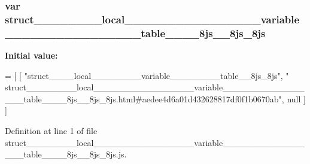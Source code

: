 \subsubsection[{struct\+\_\+\+\_\+\+\_\+\+\_\+\+\_\+\+\_\+\+\_\+\+\_\+local\+\_\+\+\_\+\+\_\+\+\_\+\+\_\+\+\_\+\+\_\+\+\_\+\+\_\+\+\_\+\+\_\+\+\_\+\+\_\+\+\_\+\+\_\+\+\_\+variable\+\_\+\+\_\+\+\_\+\+\_\+\+\_\+\+\_\+\+\_\+\+\_\+\+\_\+\+\_\+\+\_\+\+\_\+\+\_\+\+\_\+\+\_\+\+\_\+table\+\_\+\+\_\+\+\_\+\+\_\+8js\+\_\+\+\_\+8js\+\_\+8js}]{\setlength{\rightskip}{0pt plus 5cm}var struct\+\_\+\+\_\+\+\_\+\+\_\+\+\_\+\+\_\+\+\_\+\+\_\+local\+\_\+\+\_\+\+\_\+\+\_\+\+\_\+\+\_\+\+\_\+\+\_\+\+\_\+\+\_\+\+\_\+\+\_\+\+\_\+\+\_\+\+\_\+\+\_\+variable\+\_\+\+\_\+\+\_\+\+\_\+\+\_\+\+\_\+\+\_\+\+\_\+\+\_\+\+\_\+\+\_\+\+\_\+\+\_\+\+\_\+\+\_\+\+\_\+table\+\_\+\+\_\+\+\_\+\+\_\+8js\+\_\+\+\_\+8js\+\_\+8js}\label{struct________________local________________________________variable_____________________________7445e5fb55ab655c544fb32f1a90e256_a1324910b698df5e69918acfd7d79f279}
{\bfseries Initial value\+:}
\begin{DoxyCode}
=
[
    [ \textcolor{stringliteral}{"struct\_\_\_\_local\_\_\_\_\_\_\_\_variable\_\_\_\_\_\_\_\_table\_\_8js\_8js"}, \textcolor{stringliteral}{"
      struct\_\_\_\_\_\_\_\_local\_\_\_\_\_\_\_\_\_\_\_\_\_\_\_\_variable\_\_\_\_\_\_\_\_\_\_\_\_\_\_\_\_table\_\_\_\_8js\_\_8js\_8js.html#aedee4d6a01d432628817df0f1b0670ab"}, null ]
]
\end{DoxyCode}


Definition at line 1 of file struct\+\_\+\+\_\+\+\_\+\+\_\+\+\_\+\+\_\+\+\_\+\+\_\+local\+\_\+\+\_\+\+\_\+\+\_\+\+\_\+\+\_\+\+\_\+\+\_\+\+\_\+\+\_\+\+\_\+\+\_\+\+\_\+\+\_\+\+\_\+\+\_\+variable\+\_\+\+\_\+\+\_\+\+\_\+\+\_\+\+\_\+\+\_\+\+\_\+\+\_\+\+\_\+\+\_\+\+\_\+\+\_\+\+\_\+\+\_\+\+\_\+table\+\_\+\+\_\+\+\_\+\+\_\+8js\+\_\+\+\_\+8js\+\_\+8js.\+js.

